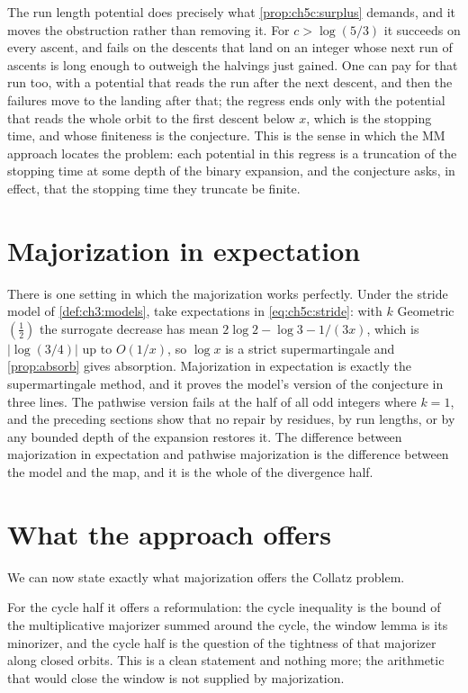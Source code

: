 The run length potential does precisely what \cref{prop:ch5c:surplus} demands,
and it moves the obstruction rather than removing it. For $c>\log(5/3)$ it succeeds on every
ascent, and fails on the descents that land on an integer whose next run of
ascents is long enough to outweigh the halvings just gained. One can pay for
that run too, with a potential that reads the run after the next descent, and
then the failures move to the landing after that; the regress ends only with the
potential that reads the whole orbit to the first descent below $x$, which is
the stopping time, and whose finiteness is the conjecture. This is the
sense in which the MM approach locates the problem: each potential in this regress is
a truncation of the stopping time at some depth of the binary expansion, and
the conjecture asks, in effect, that the stopping time they truncate be finite.

\section{Majorization in expectation}\label{sec:ch5c:expectation}

There is one setting in which the majorization works perfectly. Under the stride model of
\cref{def:ch3:models}, take expectations in \eqref{eq:ch5c:stride}: with $k$
Geometric$(\tfrac12)$ the surrogate decrease has mean
$2\log2-\log3-1/(3x)$, which is $|\log(3/4)|$ up to $O(1/x)$, so $\log x$ is a strict supermartingale and
\cref{prop:absorb} gives absorption. Majorization in expectation is exactly the
supermartingale method, and it proves the model's version of the conjecture in
three lines. The pathwise version fails at the half of all odd integers where
$k=1$, and the preceding sections show that no repair by residues, by run
lengths, or by any bounded depth of the expansion restores it. The difference
between majorization in expectation and pathwise majorization is the difference
between the model and the map, and it is the whole of the divergence half.

\section{What the approach offers}\label{sec:ch5c:verdict}

We can now state exactly what majorization offers the Collatz problem.

For the cycle half it offers a reformulation: the cycle inequality is the
bound of the multiplicative majorizer summed around the cycle, the
window lemma is its minorizer, and the cycle half is the question of the
tightness of that majorizer along closed orbits. This is a clean statement and
nothing more; the arithmetic that would close the window is not supplied by
majorization.

